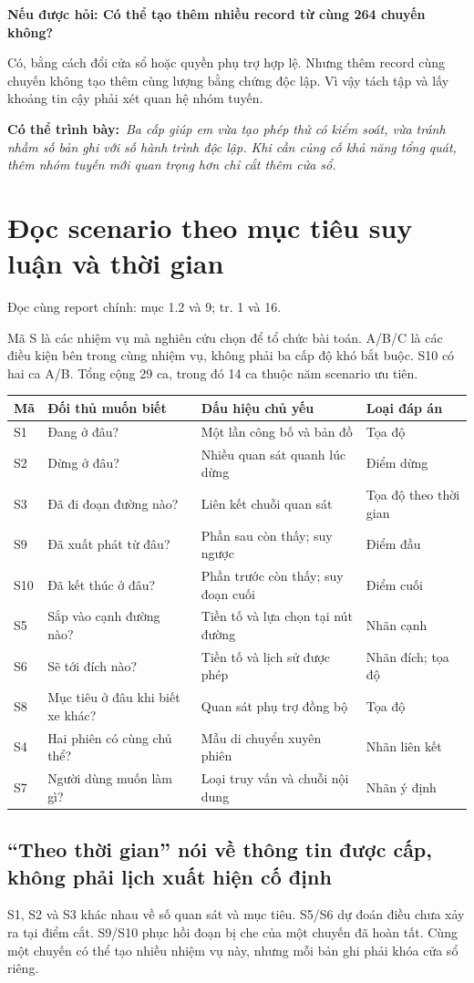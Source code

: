 \documentclass[10pt,a4paper]{article}
\newcommand{\say}[1]{\par\textbf{Có thể trình bày:}\ \textit{#1}\par}
\newcommand{\ask}[2]{\par\textbf{Nếu được hỏi: #1}\par #2\par}
\newcommand{\where}[1]{\par{\small\color{gray}Đọc cùng report chính: #1.}\par}
\newcommand{\guidepage}[1]{\clearpage\section{#1}}
\begin{document}
\ask{Có thể tạo thêm nhiều record từ cùng 264 chuyến không?}{Có, bằng cách đổi cửa sổ hoặc quyền phụ trợ hợp lệ. Nhưng thêm record cùng chuyến không tạo thêm cùng lượng bằng chứng độc lập. Vì vậy tách tập và lấy khoảng tin cậy phải xét quan hệ nhóm tuyến.}
\say{Ba cấp giúp em vừa tạo phép thử có kiểm soát, vừa tránh nhầm số bản ghi với số hành trình độc lập. Khi cần củng cố khả năng tổng quát, thêm nhóm tuyến mới quan trọng hơn chỉ cắt thêm cửa sổ.}

\guidepage{Đọc scenario theo mục tiêu suy luận và thời gian}
\where{mục 1.2 và 9; tr. 1 và 16}
Mã S là các nhiệm vụ mà nghiên cứu chọn để tổ chức bài toán. A/B/C là các điều kiện bên trong cùng nhiệm vụ, không phải ba cấp độ khó bắt buộc. S10 có hai ca A/B. Tổng cộng 29 ca, trong đó 14 ca thuộc năm scenario ưu tiên.

\begin{longtable}{@{}P{1.3cm}P{4.7cm}P{6.0cm}P{4.0cm}@{}}
\toprule Mã & Đối thủ muốn biết & Dấu hiệu chủ yếu & Loại đáp án\\\midrule
S1 & Đang ở đâu? & Một lần công bố và bản đồ & Tọa độ\\[3pt]
S2 & Dừng ở đâu? & Nhiều quan sát quanh lúc dừng & Điểm dừng\\[3pt]
S3 & Đã đi đoạn đường nào? & Liên kết chuỗi quan sát & Tọa độ theo thời gian\\[3pt]
S9 & Đã xuất phát từ đâu? & Phần sau còn thấy; suy ngược & Điểm đầu\\[3pt]
S10 & Đã kết thúc ở đâu? & Phần trước còn thấy; suy đoạn cuối & Điểm cuối\\[3pt]
S5 & Sắp vào cạnh đường nào? & Tiền tố và lựa chọn tại nút đường & Nhãn cạnh\\[3pt]
S6 & Sẽ tới đích nào? & Tiền tố và lịch sử được phép & Nhãn đích; tọa độ\\[3pt]
S8 & Mục tiêu ở đâu khi biết xe khác? & Quan sát phụ trợ đồng bộ & Tọa độ\\[3pt]
S4 & Hai phiên có cùng chủ thể? & Mẫu di chuyển xuyên phiên & Nhãn liên kết\\[3pt]
S7 & Người dùng muốn làm gì? & Loại truy vấn và chuỗi nội dung & Nhãn ý định\\
\bottomrule
\end{longtable}

\subsection*{``Theo thời gian'' nói về thông tin được cấp, không phải lịch xuất hiện cố định}
S1, S2 và S3 khác nhau về số quan sát và mục tiêu. S5/S6 dự đoán điều chưa xảy ra tại điểm cắt. S9/S10 phục hồi đoạn bị che của một chuyến đã hoàn tất. Cùng một chuyến có thể tạo nhiều nhiệm vụ này, nhưng mỗi bản ghi phải khóa cửa sổ riêng.
\end{document}
